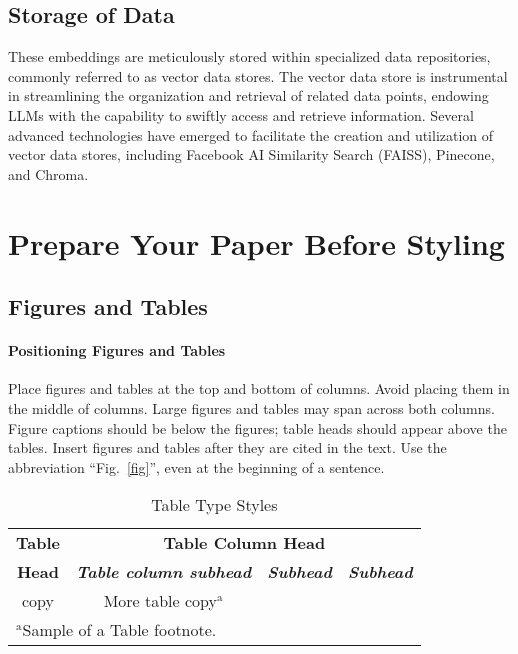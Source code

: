 \documentclass[conference]{IEEEtran}
\begin{document}
\subsection{Storage of Data}

These embeddings are meticulously stored within specialized data repositories, commonly referred to as vector data stores. The vector data store is instrumental in streamlining the organization and retrieval of related data points, endowing LLMs with the capability to swiftly access and retrieve information. Several advanced technologies have emerged to facilitate the creation and utilization of vector data stores, including Facebook AI Similarity Search (FAISS), Pinecone, and Chroma. 


\section{Prepare Your Paper Before Styling}

\subsection{Figures and Tables}
\paragraph{Positioning Figures and Tables} Place figures and tables at the top and 
bottom of columns. Avoid placing them in the middle of columns. Large 
figures and tables may span across both columns. Figure captions should be 
below the figures; table heads should appear above the tables. Insert 
figures and tables after they are cited in the text. Use the abbreviation 
``Fig.~\ref{fig}'', even at the beginning of a sentence.

\begin{table}[htbp]
\caption{Table Type Styles}
\begin{center}
\begin{tabular}{|c|c|c|c|}
\hline
\textbf{Table}&\multicolumn{3}{|c|}{\textbf{Table Column Head}} \\
\cline{2-4} 
\textbf{Head} & \textbf{\textit{Table column subhead}}& \textbf{\textit{Subhead}}& \textbf{\textit{Subhead}} \\
\hline
copy& More table copy$^{\mathrm{a}}$& &  \\
\hline
\multicolumn{4}{l}{$^{\mathrm{a}}$Sample of a Table footnote.}
\end{tabular}
\label{tab1}
\end{center}
\end{table}
\end{document}
